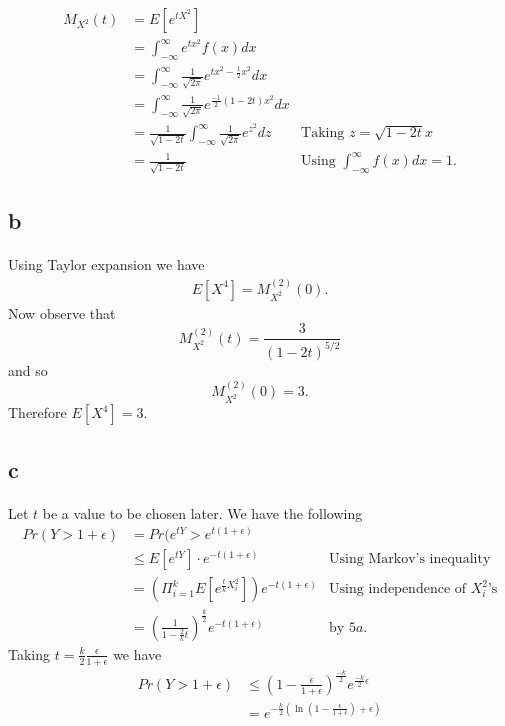 \documentclass[letterpaper,12pt,oneside,onecolumn]{article}
\begin{document}
\paragraph{}
\begin{align*}
M_{X^2}(t) &= E[e^{tX^2}] \\
&= \int_{-\infty}^\infty e^{tx^2}f(x)dx \\
&=\int_{-\infty}^\infty \frac{1}{\sqrt{2\pi}}e^{tx^2-\frac{1}{2}x^2}dx \\
&= \int_{-\infty}^\infty \frac{1}{\sqrt{2\pi}}e^{\frac{-1}{2}(1-2t)x^2}dx \\
&= \frac{1}{\sqrt{1-2t}}\int_{-\infty}^\infty \frac{1}{\sqrt{2\pi}}e^{z^2}dz &\text{Taking $z=\sqrt{1-2t}x$} \\
&= \frac{1}{\sqrt{1-2t}} &\text{Using $\int_{-\infty}^\infty f(x)dx = 1$}.
\end{align*}
\subsection{b}
\paragraph{}
Using Taylor expansion we have
\begin{align*}
E[X^4] = M_{X^2}^{(2)}(0).
\end{align*}
Now observe that
$$M_{X^2}^{(2)}(t) = \frac{3}{(1-2t)^{5/2}}$$
and so
$$M_{X^2}^{(2)}(0) = 3.$$
Therefore $E[X^4] = 3$.
\subsection{c}
\paragraph{}
Let $t$ be a value to be chosen later. We have the following
\begin{align*}
Pr(Y > 1+\epsilon) &= Pr(e^{tY}> e^{t(1+\epsilon)} \\
&\leq E[e^{tY}]\cdot e^{-t(1+\epsilon)}  &\text{Using Markov's inequality} \\
&= (\Pi_{i=1}^k E[e^{\frac{t}{k}X_i^2}])e^{-t(1+\epsilon)} &\text{Using independence of $X_i^2$'s} \\
&=(\frac{1}{1-\frac{2}{k}t})^{\frac{k}{2}}e^{-t(1+\epsilon)} &\text{by $5a$}.
\end{align*}
Taking $t=\frac{k}{2}\frac{\epsilon}{1+\epsilon}$ we have
\begin{align*}
Pr(Y>1+\epsilon) &\leq (1 - \frac{\epsilon}{1+\epsilon})^\frac{-k}{2}e^{\frac{-k}{2}\epsilon}\\
&=e^{-\frac{k}{2}(\ln(1-\frac{\epsilon}{1+\epsilon}) + \epsilon)}
\end{align*}
\end{document}
